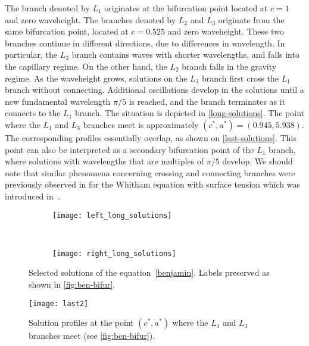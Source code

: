 The branch denoted by $L_1$ originates at the bifurcation point 
located at $c = 1$ and zero waveheight.
The branches denoted by $L_2$ and $L_3$ originate from the same bifurcation point,
located at $c = 0.525$ and zero waveheight. 
These two branches continue in different directions, due to differences in wavelength.
In particular, the $L_3$ branch contains waves with shorter wavelengths, and falls into the  
capillary regime. On the other hand, the $L_2$ branch falls in the gravity regime.
As the waveheight grows, solutions on the $L_3$ branch first cross the $L_1$ branch without
connecting. Additional oscillations develop in the solutions until 
a new fundamental wavelength $\pi/5$ is reached, and the branch terminates
as it connects to the $L_1$ branch. The situation is depicted in \autoref{long-solutions}. 
The point where the $L_1$ and $L_3$ branches meet
is approximately $(c^*,a^*) = (0.945, 5.938)$.
The corresponding profiles essentially overlap, as shown on \autoref{last-solutions}.
This point can also be interpreted as a secondary bifurcation point 
of the $L_1$ branch, where solutions with wavelengths that are multiples of $\pi/5$ develop. 
We should note that similar phenomena concerning crossing and connecting
branches were previously observed in \cite{RK}
for the Whitham equation with surface tension which was introduced in~\cite{HurJohnson}. 
	
\begin{figure}[ht]
\begin{subfigure}
	\centering
	\texttt{[image: left\_long\_solutions]}      
	    \end{subfigure}%
~%
\begin{subfigure}
        \centering
		\texttt{[image: right\_long\_solutions]}{}      
    \end{subfigure}%
	\caption{\small Selected solutions of the equation~\eqref{benjamin}. 
Labels preserved as shown in \autoref{fig:ben-bifur}.}
\label{long-solutions}
\end{figure} 

\begin{figure}[ht]
        \centering
		\texttt{[image: last2]}{}      
	\caption{\small Solution profiles at the point $(c^*, a^*)$ where the $L_1$ and $L_3$ branches meet (see \autoref{fig:ben-bifur}).}
\label{last-solutions}
\end{figure} 

